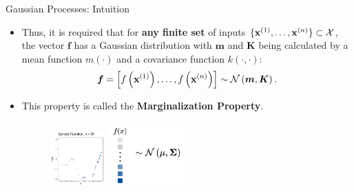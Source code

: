 \begin{frame}[c,allowframebreaks]{Gaussian Processes: Intuition}
\framebreak


\begin{itemize}
\item Thus, it is required that for \textbf{any finite set} of inputs $\{\mathbf{x}^{(1)},\dots,\mathbf{x}^{(n)}\} \subset \mathcal{X}$, the vector $\mathbf{f}$ has a Gaussian distribution with $\bm{m}$ and $\bm{K}$ being calculated by a mean function $m(\cdot)$ and a covariance function $k(\cdot,\cdot)$:\vspace{-.2cm}$$\bm{f} = \left[f\left(\mathbf{x}^{(1)}\right),\dots, f\left(\mathbf{x}^{(n)}\right)\right] \sim\mathcal{N}\left(\bm{m},\bm{K}\right).$$
    
\item This property is called the \textbf{Marginalization Property}. 
\vspace{.15cm}
\begin{figure}
\includegraphics[width=0.2\textwidth]{figure_man/discrete/example_marginalization_50.pdf}
\includegraphics[width=0.3\textwidth]{figure_man/discrete/marginalization-more.png}
\end{figure}
\end{itemize}
\end{frame}

